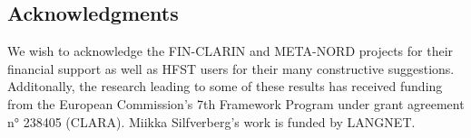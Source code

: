 \documentclass{llncs}
\begin{document}
\subsection*{Acknowledgments}
We wish to acknowledge the FIN-CLARIN and META-NORD projects for their financial support 
as well as HFST users for their many constructive suggestions. Additonally, the research leading to
some of these results has received funding from the European Commission's 7th
Framework Program under grant agreement n° 238405 (CLARA). Miikka Silfverberg's work is funded by
LANGNET.





\end{document}
